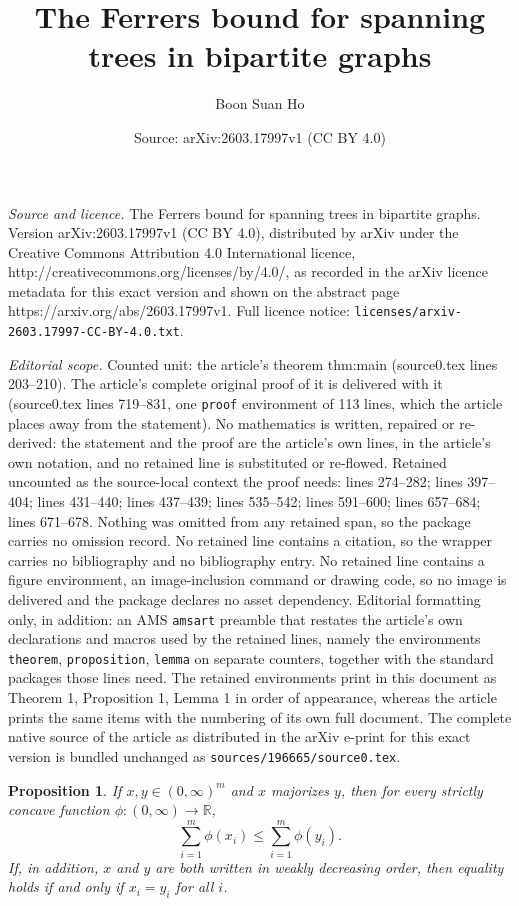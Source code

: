 \documentclass[10pt,a4paper]{amsart}
\title{The Ferrers bound for spanning trees in bipartite graphs}
\author{Boon Suan Ho}
\date{Source: arXiv:2603.17997v1 (CC BY 4.0)}
\newtheorem{proposition}{Proposition}
\newcommand{\RR}{\mathbb R}
\begin{document}
\maketitle

\noindent\emph{Source and licence.} The Ferrers bound for spanning trees in bipartite graphs. Version arXiv:2603.17997v1 (CC BY 4.0), distributed by arXiv under the Creative Commons Attribution 4.0 International licence, http://creativecommons.org/licenses/by/4.0/, as recorded in the arXiv licence metadata for this exact version and shown on the abstract page https://arxiv.org/abs/2603.17997v1. Full licence notice: \texttt{licenses/arxiv-2603.17997-CC-BY-4.0.txt}.\par\smallskip

\noindent\textit{Editorial scope.} Counted unit: the article's theorem thm:main (source0.tex lines 203--210). The article's complete original proof of it is delivered with it (source0.tex lines 719--831, one \texttt{proof} environment of 113 lines, which the article places away from the statement). No mathematics is written, repaired or re-derived: the statement and the proof are the article's own lines, in the article's own notation, and no retained line is substituted or re-flowed.  Retained uncounted as the source-local context the proof needs: lines 274--282; lines 397--404; lines 431--440; lines 437--439; lines 535--542; lines 591--600; lines 657--684; lines 671--678.  Nothing was omitted from any retained span, so the package carries no omission record.  No retained line contains a citation, so the wrapper carries no bibliography and no bibliography entry.  No retained line contains a figure environment, an image-inclusion command or drawing code, so no image is delivered and the package declares no asset dependency.  Editorial formatting only, in addition: an AMS \texttt{amsart} preamble that restates the article's own declarations and macros used by the retained lines, namely the environments \texttt{theorem}, \texttt{proposition}, \texttt{lemma} on separate counters, together with the standard packages those lines need.  The retained environments print in this document as Theorem 1, Proposition 1, Lemma 1 in order of appearance, whereas the article prints the same items with the numbering of its own full document.  The complete native source of the article as distributed in the arXiv e-print for this exact version is bundled unchanged as \texttt{sources/196665/source0.tex}.
\begin{proposition}\label{prop:strict-schur}
If $x,y\in(0,\infty)^m$ and $x$ majorizes $y$, then for every strictly 
concave function $\phi\colon(0,\infty)\to\RR$,
\[
\sum_{i=1}^m \phi(x_i)\le \sum_{i=1}^m \phi(y_i).
\]
If, in addition, $x$ and $y$ are both written in weakly decreasing order, 
then equality holds if and only if $x_i=y_i$ for all $i$.
\end{proposition}
\end{document}
